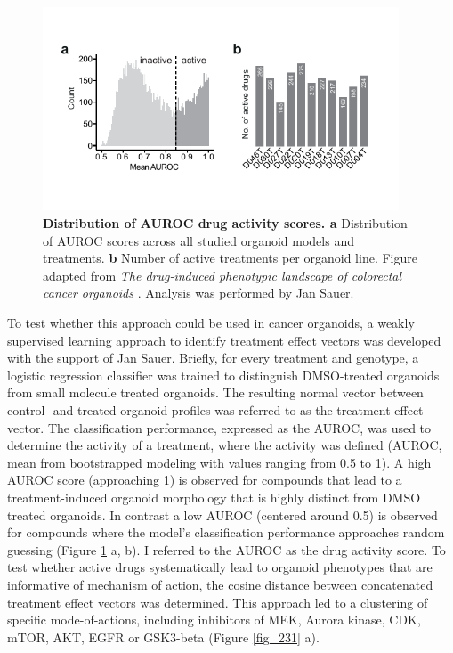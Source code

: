 \begin{flushleft}
\begin{figure}[!h]
\centering
\includegraphics[width=300pt,
                height=\textheight,
                keepaspectratio]{figures/promise/pdf/fig_3_0_1.pdf}
\caption[Distribution of AUROC drug activity scores]{\textbf{Distribution of AUROC drug activity scores. a} Distribution of AUROC scores across all studied organoid models and treatments. \textbf{b} Number of active treatments per organoid line. Figure adapted from \textit{The drug-induced phenotypic landscape of colorectal cancer organoids} \parencite{betgeDruginducedPhenotypicLandscape2022}. Analysis was performed by Jan Sauer.}
\label{fig_230}
\end{figure}
\bigbreak

To test whether this approach could be used in cancer organoids, a weakly supervised learning approach to identify treatment effect vectors was developed with the support of Jan Sauer. Briefly, for every treatment and genotype, a logistic regression classifier was trained to distinguish DMSO-treated organoids from small molecule treated organoids. The resulting normal vector between control- and treated organoid profiles was referred to as the treatment effect vector. The classification performance, expressed as the AUROC, was used to determine the activity of a treatment, where the activity was defined  (AUROC, mean from bootstrapped modeling with values ranging from 0.5 to 1). A high AUROC score (approaching 1) is observed for compounds that lead to a treatment-induced organoid morphology that is highly distinct from DMSO treated organoids. In contrast a low AUROC (centered around 0.5) is observed for compounds where the model's classification performance approaches random guessing (Figure \ref{fig_230} a, b). I referred to the AUROC as the drug activity score. To test whether active drugs systematically lead to organoid phenotypes that are informative of mechanism of action, the cosine distance between concatenated treatment effect vectors was determined. This approach led to a clustering of specific mode-of-actions, including inhibitors of MEK, Aurora kinase, CDK, mTOR, AKT, EGFR or GSK3-beta (Figure \ref{fig_231} a). 
\bigbreak


\end{flushleft}
